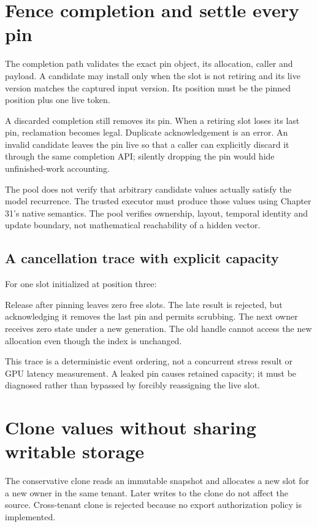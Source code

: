 \section{Fence completion and settle every pin}
The completion path validates the exact pin object, its allocation, caller
and payload. A candidate may install only when the slot is not retiring and
its live version matches the captured input version. Its position must be the
pinned position plus one live token.

A discarded completion still removes its pin. When a retiring slot loses its
last pin, reclamation becomes legal. Duplicate acknowledgement is an error.
An invalid candidate leaves the pin live so that a caller can explicitly discard
it through the same completion API; silently dropping the pin would hide
unfinished-work accounting.

The pool does not verify that arbitrary candidate values actually satisfy the
model recurrence. The trusted executor must produce those values using
Chapter 31's native semantics. The pool verifies ownership, layout, temporal
identity and update boundary, not mathematical reachability of a hidden vector.

\subsection{A cancellation trace with explicit capacity}
For one slot initialized at position three:
\begin{center}\end{center}
Release after pinning leaves zero free slots. The late result is rejected,
but acknowledging it removes the last pin and permits scrubbing.
The next owner receives zero state under a new generation. The old handle
cannot access the new allocation even though the index is unchanged.

This trace is a deterministic event ordering, not a concurrent stress result
or GPU latency measurement. A leaked pin causes retained capacity; it must be
diagnosed rather than bypassed by forcibly reassigning the live slot.

\section{Clone values without sharing writable storage}
The conservative clone reads an immutable snapshot and allocates a new slot
for a new owner in the same tenant. Later writes to the clone do not affect
the source. Cross-tenant clone is rejected because no export authorization
policy is implemented.

